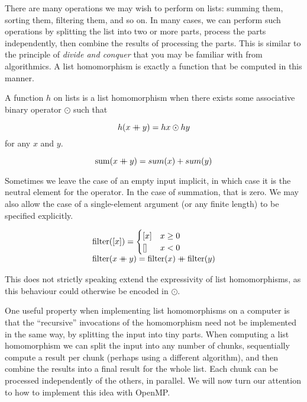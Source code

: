 There are many operations we may wish to perform on lists: summing
them, sorting them, filtering them, and so on. In many cases, we can
perform such operations by splitting the list into two or more parts,
process the parts independently, then combine the results of
processing the parts. This is similar to the principle of \emph{divide
  and conquer} that you may be familiar with from algorithmics. A list
homomorphism is exactly a function that be computed in this manner.

\begin{definition}
  A function $h$ on lists is a list homomorphism when there exists
  some associative binary operator $\odot{}$ such that

\[
  h (x \mathbin{+\mkern-10mu+} y) = h x \odot h y
\]
for any $x$ and $y$.
\end{definition}

\begin{example}[Summation is a list homomorphism with $\odot=+$]
  \[
    \textrm{sum}(x \mathbin{+\mkern-10mu+} y) = sum(x) + sum(y)
  \]
\end{example}

Sometimes we leave the case of an empty input implicit, in which case
it is the neutral element for the operator. In the case of summation,
that is zero. We may also allow the case of a single-element argument
(or any finite length) to be specified explicitly.

\begin{example}
  \[
    \begin{array}{l}
      \textrm{filter}([x]) =
      \begin{cases}
        [x] & x \geq 0 \\
        [] & x < 0 \
      \end{cases}\\
      \textrm{filter}(x \mathbin{+\mkern-10mu+} y) = \textrm{filter}(x) \mathbin{+\mkern-10mu+} \textrm{filter}(y)
    \end{array}
  \]
\end{example}

This does not strictly speaking extend the expressivity of list
homomorphisms, as this behaviour could otherwise be encoded in
$\odot$.

One useful property when implementing list homomorphisms on a computer
is that the ``recursive'' invocations of the homomorphism need not be
implemented in the same way, by splitting the input into tiny parts.
When computing a list homomorphism we can split the input into any
number of chunks, sequentially compute a result per chunk (perhaps
using a different algorithm), and then combine the results into a
final result for the whole list. Each chunk can be processed
independently of the others, in parallel. We will now turn our
attention to how to implement this idea with OpenMP.

